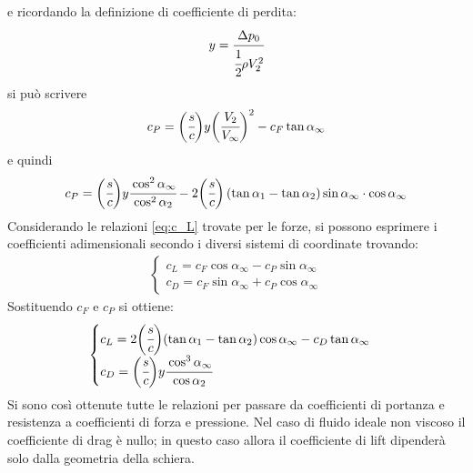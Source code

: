 e ricordando la definizione di coefficiente di perdita:
\begin{align*}
y = \cfrac{\Delta p_0}{\cfrac{1}{2} \rho V_2^2}
\end{align*}
si può scrivere
\begin{align*}
c_P = \bigg(\cfrac{s}{c}\bigg)y \bigg(\cfrac{V_2}{V_{\infty}}\bigg)^2 - c_F \tan \alpha_{\infty}
\end{align*}
e quindi
\begin{equation}
c_P = \bigg(\cfrac{s}{c}\bigg)y \cfrac{\cos^2 \alpha_{\infty}}{\cos^2 \alpha_2} -2\bigg(\cfrac{s}{c}\bigg) \left(\tan \alpha_1 - \tan \alpha_2 \right) \sin \alpha_{\infty} \cdot \cos \alpha_{\infty}
\end{equation} 
Considerando le relazioni \ref{eq:c_L} trovate per le forze, si possono esprimere i coefficienti adimensionali secondo i diversi sistemi di coordinate trovando:
\begin{align*}
\begin{cases}
c_L = c_F \cos \alpha_{\infty} - c_P \sin \alpha_{\infty} \\
c_D = c_F \sin \alpha_{\infty} + c_P \cos \alpha_{\infty}
\end{cases}
\end{align*}
Sostituendo $c_F$ e $c_P$ si ottiene:
\begin{equation}
\begin{cases}
c_L = 2 \bigg(\cfrac{s}{c}\bigg) (\tan \alpha_1 - \tan \alpha_2) \cos \alpha_{\infty} - c_D \tan \alpha_{\infty} \\
c_D = \bigg(\cfrac{s}{c}\bigg) y \cfrac{\cos^3 \alpha_{\infty}}{\cos \alpha_2}
\end{cases}
\end{equation}
Si sono così ottenute tutte le relazioni per passare da coefficienti di portanza e resistenza a coefficienti di forza e pressione. Nel caso di fluido ideale non viscoso il coefficiente di drag è nullo; in questo caso allora il coefficiente di lift dipenderà solo dalla geometria della schiera.
